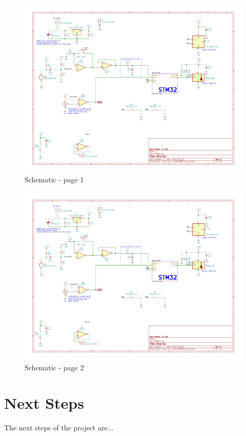 \documentclass{article}
\begin{document}
\begin{figure}[H]
\centering
\includegraphics[scale=0.7, angle=90, page=1]{../birdEar/plot/birdEar.pdf}
\caption{Schematic - page 1}
\label{sch1}
\end{figure}

\begin{figure}[H]
\centering
\includegraphics[scale=0.7, angle=90, page=2]{../birdEar/plot/birdEar.pdf}
\caption{Schematic - page 2}
\label{sch2}
\end{figure}

\section{Next Steps}
The next steps of the project are...
\end{document}
